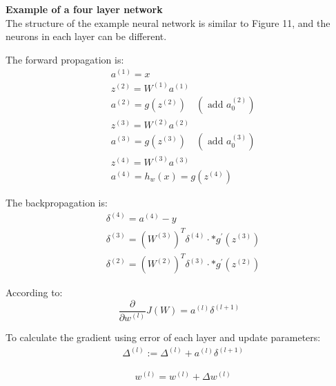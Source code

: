 \documentclass{article}
\begin{document}
\begin{mdframed}[hidealllines=true,backgroundcolor=gray!20]
\textbf{Example of a four layer network}\\
The structure of the example neural network is similar to Figure 11, and the neurons in each layer can be different.

The forward propagation is:
\begin{equation}
\begin{aligned} & a^{(1)}=x \\ & z^{(2)}=W^{(1)} a^{(1)} \\ & a^{(2)}=g\left(z^{(2)}\right) \quad\left(\text { add } a_0^{(2)}\right) \\ & z^{(3)}=W^{(2)} a^{(2)} \\ & a^{(3)}=g\left(z^{(3)}\right) \quad\left(\text { add } a_0^{(3)}\right) \\ & z^{(4)}=W^{(3)} a^{(3)} \\ & a^{(4)}=h_{w}(x)=g\left(z^{(4)}\right)\end{aligned}
\end{equation}

The backpropagation is:
\begin{equation}
\begin{aligned} & \delta^{(4)}=a^{(4)}-y \\ & \delta^{(3)}=\left(W^{(3)}\right)^T \delta^{(4)} \cdot * g^{\prime}\left(z^{(3)}\right) \\ & \delta^{(2)}=\left(W^{(2)}\right)^T \delta^{(3)} \cdot * g^{\prime}\left(z^{(2)}\right)\end{aligned}
\end{equation}

According to:
\begin{equation}
\frac{\partial}{\partial w^{(l)}} J(W)=a^{(l)} \delta^{(l+1)}
\end{equation}

To calculate the gradient using error of each layer and update parameters:
\begin{equation}
\begin{aligned} & \Delta^{(l)}:=\Delta^{(l)}+a^{(l)} \delta^{(l+1)}\end{aligned}
\end{equation}

\begin{equation}
\begin{aligned} & w^{(l)}=w^{(l)}+\Delta w^{(l)}\end{aligned}
\end{equation}

\end{mdframed}
\end{document}
